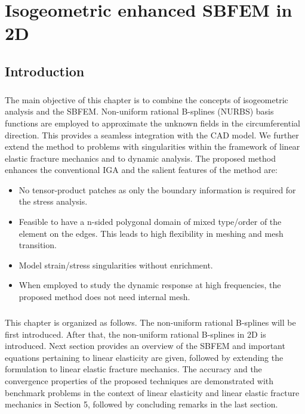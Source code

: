 \chapter{Isogeometric enhanced SBFEM in 2D}
\section{Introduction}
\paragraph{}
The main objective of this chapter is to combine the concepts of isogeometric analysis and the SBFEM.
Non-uniform rational B-splines (NURBS) basis functions are employed to approximate the unknown fields in the circumferential direction.
This provides a seamless integration with the CAD model.
We further extend the method to problems with singularities within the framework of linear elastic fracture mechanics and to dynamic analysis.
The proposed method enhances the conventional IGA and the salient features of the method are:
    \begin{itemize}
        \item No tensor-product patches as only the boundary information is required for the stress analysis.
        \item Feasible to have a n-sided polygonal domain of mixed type/order of the element on the edges.
                This leads to high flexibility in meshing and mesh transition.
        \item Model strain/stress singularities without enrichment.
        \item When employed to study the dynamic response at high frequencies, the proposed method does not need internal mesh.
    \end{itemize}

\paragraph{}
This chapter is organized as follows.
The non-uniform rational B-splines will be first introduced.
After that, the non-uniform rational B-splines in 2D is introduced.
Next section provides an overview of the SBFEM and important equations pertaining to linear elasticity are given, followed by extending the formulation to linear elastic fracture mechanics.
The accuracy and the convergence properties of the proposed techniques are demonstrated with benchmark problems in the context of linear elasticity and linear elastic fracture mechanics in Section 5, followed by concluding remarks in the last section.
\pagebreak
